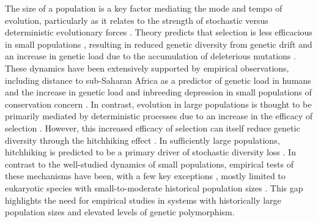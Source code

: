 \documentclass[11pt]{article}
\begin{document}
The size of a population is a key factor mediating the mode and tempo of evolution,
particularly as it relates to the strength of stochastic versus deterministic evolutionary
forces \citep{kimura_mutation_1963,gillespie_genetic_2000}. Theory predicts that
selection is less efficacious in small populations \citep{charlesworth_effective_2009,
gravel_when_2016}, resulting in reduced genetic diversity from genetic drift and an
increase in genetic load due to the accumulation of deleterious mutations
\citep{lynch_mutation_1995,lande_risk_1994,dussex_purging_2023}. These dynamics have
been extensively supported by empirical observations, including distance to sub-Saharan
Africa as a predictor of genetic load in humans \citep{henn_distance_2016} and
the increase in genetic load and inbreeding depression in small populations of
conservation concern \citep{tian_severe_2022,mathur_genetic_2021,
kardos_inbreeding_2023}. In contrast, evolution in large populations is thought to
be primarily mediated by deterministic processes due to an increase in the efficacy
of selection \citep{charlesworth_effective_2009,gravel_when_2016,
lanfear_population_2014}. However, this increased efficacy of selection can itself
reduce genetic diversity through the hitchhiking effect \citep{smith_hitch-hiking_1974}.
In sufficiently large populations, hitchhiking is predicted to be a primary driver
of stochastic diversity loss \citep{gillespie_genetic_2000,gillespie_role_1999}.
In contrast to the well-studied dynamics of small populations, empirical tests of
these mechanisms have been, with a few key exceptions \citep{dey_molecular_2013,
teterina_pervasive_2025}, mostly limited to eukaryotic species with
small-to-moderate historical population sizes \citep{cutter_molecular_2013,
leffler_revisiting_2012,buffalo_quantifying_2021}. This gap highlights the need for
empirical studies in systems with historically large population sizes and elevated
levels of genetic polymorphism.
\vspace{0.2cm}
\end{document}
